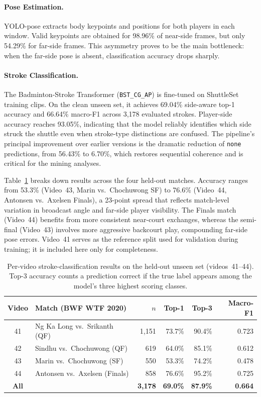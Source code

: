 \paragraph{Pose Estimation.}
YOLO-pose extracts body keypoints and positions for both players in each window.
Valid keypoints are obtained for 98.96\% of near-side frames, but only 54.29\%
for far-side frames. This asymmetry proves to be the main bottleneck: when the
far-side pose is absent, classification accuracy drops sharply.

\paragraph{Stroke Classification.}
The Badminton-Stroke Transformer (\texttt{BST\_CG\_AP}) is fine-tuned on
ShuttleSet training clips. On the clean unseen set, it achieves 69.04\%
side-aware top-1 accuracy and 66.64\% macro-F1 across 3{,}178 evaluated strokes.
Player-side accuracy reaches 93.05\%, indicating that the model reliably
identifies which side struck the shuttle even when stroke-type distinctions are
confused.  The pipeline’s principal improvement over earlier versions is the
dramatic reduction of \texttt{none} predictions, from 56.43\% to 6.70\%, which
restores sequential coherence and is critical for the mining analyses.

Table~\ref{tab:per_video} breaks down results across the four held-out
matches. Accuracy ranges from 53.3\% (Video~43, Marin vs.\ Chochuwong
SF) to 76.6\% (Video~44, Antonsen vs.\ Axelsen Finals), a 23-point
spread that reflects match-level variation in broadcast angle and
far-side player visibility. The Finals match (Video~44) benefits from
more consistent near-court exchanges, whereas the semi-final
(Video~43) involves more aggressive backcourt play, compounding
far-side pose errors. Video~41 serves as the reference split used for
validation during training; it is included here only for completeness.

\begin{table}[t]
  \caption{Per-video stroke-classification results on the held-out
  unseen set (videos~41--44). Top-3 accuracy counts a prediction
  correct if the true label appears among the model’s three highest
  scoring classes.}
  \label{tab:per_video}
  \centering
  \small
  \begin{tabular}{clrrrr}
    \toprule
    Video & Match (BWF WTF 2020) & $n$ & Top-1 & Top-3 & Macro-F1 \\
    \midrule
    41 & Ng Ka Long vs.\ Srikanth (QF)  & 1{,}151 & 73.7\% & 90.4\% & 0.723 \\
    42 & Sindhu vs.\ Chochuwong (QF)    &   619   & 64.0\% & 85.1\% & 0.612 \\
    43 & Marin vs.\ Chochuwong (SF)     &   550   & 53.3\% & 74.2\% & 0.478 \\
    44 & Antonsen vs.\ Axelsen (Finals) &   858   & 76.6\% & 95.2\% & 0.725 \\
    \midrule
    \textbf{All} & & \textbf{3{,}178} & \textbf{69.0\%} & \textbf{87.9\%} & \textbf{0.664} \\
    \bottomrule
  \end{tabular}
\end{table}

